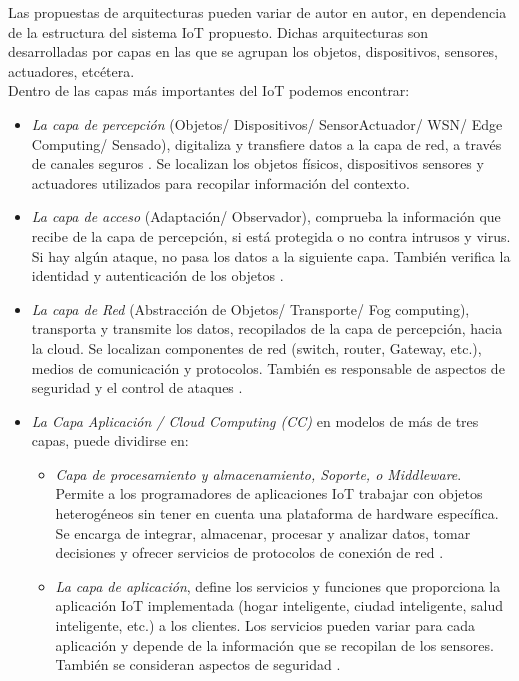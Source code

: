     Las propuestas de arquitecturas pueden variar de autor en autor, en dependencia de la estructura del sistema IoT propuesto. Dichas arquitecturas son desarrolladas por capas en las que se agrupan los objetos, dispositivos, sensores, actuadores, etcétera.\\

    Dentro de las capas más importantes del IoT podemos encontrar:

    \begin{itemize}
        \item \textit{La capa de percepción} (Objetos/ Dispositivos/ SensorActuador/ WSN/ Edge Computing/ Sensado), digitaliza y transfiere datos a la capa de red, a través de canales seguros \cite{internetOfThingsStateOfTheArt}. Se localizan los objetos físicos, dispositivos sensores y actuadores utilizados para recopilar información del contexto.
        \item \textit{La capa de acceso} (Adaptación/ Observador), comprueba la información que recibe de la capa de percepción, si está protegida o no contra intrusos y virus. Si hay algún ataque, no pasa los datos a la siguiente capa. También verifica la identidad y autenticación de los objetos \cite{internetOfThingsStateOfTheArt}.
        \item \textit{La capa de Red} (Abstracción de Objetos/ Transporte/ Fog computing), transporta y transmite los datos, recopilados de la capa de percepción, hacia la cloud. Se localizan componentes de red (switch, router, Gateway, etc.), medios de comunicación y protocolos. También es responsable de aspectos de seguridad y el control de ataques \cite{internetOfThingsStateOfTheArt}.
        \item \textit{La Capa Aplicación / Cloud Computing (CC)} en modelos de más de tres capas, puede dividirse en:
            \begin{itemize}
                \item \textit{Capa de procesamiento y almacenamiento, Soporte, o Middleware}. Permite a los programadores de aplicaciones IoT trabajar con objetos heterogéneos sin tener en cuenta una plataforma de hardware específica. Se encarga de integrar, almacenar, procesar y analizar datos, tomar decisiones y ofrecer servicios de protocolos de conexión de red \cite{internetOfThingsStateOfTheArt}.
                \item \textit{La capa de aplicación}, define los servicios y funciones que proporciona la aplicación IoT implementada (hogar inteligente, ciudad inteligente, salud inteligente, etc.) a los clientes. Los servicios pueden variar para cada aplicación y depende de la información que se recopilan de los sensores. También se consideran aspectos de seguridad \cite{internetOfThingsStateOfTheArt}.

\end{itemize}
\end{itemize}
